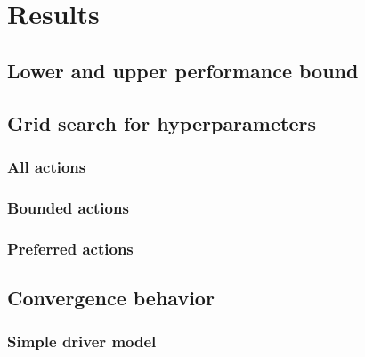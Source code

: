 \chapter{Results}
\label{ch:results}

\section{Lower and upper performance bound}

\section{Grid search for hyperparameters}



\subsection{All actions}



\subsection{Bounded actions}



\subsection{Preferred actions}



\section{Convergence behavior}

\subsection{Simple driver model}


